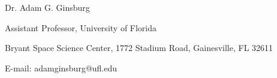 \begin{center}
{\large Dr. Adam G. Ginsburg}\\
\par Assistant Professor, University of Florida
\par Bryant Space Science Center,
1772 Stadium Road,
Gainesville, FL 32611
\par E-mail: adamginsburg@ufl.edu %
\end{center}

